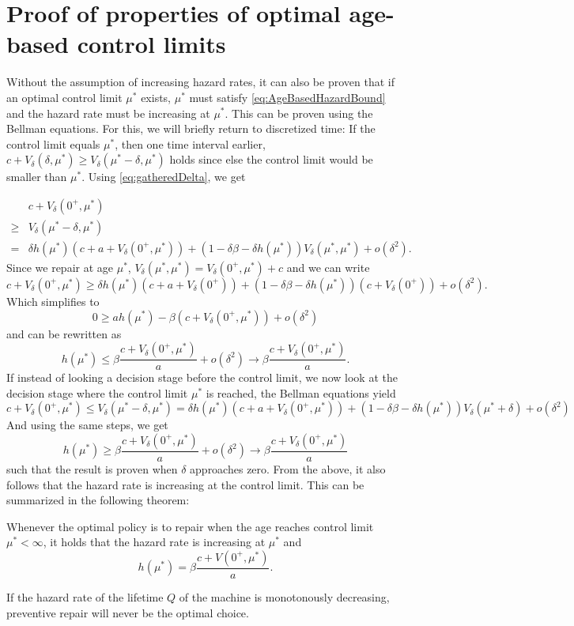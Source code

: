 \chapter{Proof of properties of optimal age-based control limits}\label{AppendixAgeBasedControlLimit}
Without the assumption of increasing hazard rates, it can also be proven that if an optimal control limit $\mu^*$ exists, $\mu^*$ must satisfy \eqref{eq:AgeBasedHazardBound} and the hazard rate must be increasing at $\mu^*$.
This can be proven using the Bellman equations.
For this, we will briefly return to discretized time:
If the control limit equals $\mu^*$, then one time interval earlier, $c+V_\delta(\delta,\mu^*)\geq V_\delta(\mu^*-\delta,\mu^*)$ holds since else the control limit would be smaller than $\mu^*$.
Using \eqref{eq:gatheredDelta}, we get

\[\begin{split}
&c+V_\delta(0^+,\mu^*)\\
\geq& V_\delta(\mu^*-\delta,\mu^*)\\
=&\delta h(\mu^*)(c+a+ V_\delta(0^+,\mu^*))+(1-\delta\beta-\delta h(\mu^*)) V_\delta(\mu^*,\mu^*)+o(\delta^2).
\end{split}
\]
Since we repair at age $\mu^*$, $V_\delta(\mu^*,\mu^*)=V_\delta(0^+,\mu^*)+c$ and we can write
$$
c+V_\delta(0^+,\mu^*)\geq \delta h(\mu^*)(c+a+ V_\delta(0^+))+(1-\delta\beta-\delta h(\mu^*)) (c+V_\delta(0^+))+o(\delta^2).
$$
Which simplifies to
$$
0\geq ah(\mu^*)-\beta (c+V_\delta(0^+,\mu^*))+o(\delta^2)
$$
and can be rewritten as
$$
h(\mu^*)\leq \beta\frac{c+V_\delta(0^+,\mu^*)}{a} +o(\delta^2)\rightarrow\beta\frac{c+V_\delta(0^+,\mu^*)}{a}.
$$
If instead of looking a decision stage before the control limit, we now look at the decision stage where the control limit $\mu^*$ is reached, the Bellman equations yield
$$
c+V_\delta(0^+,\mu^*)\leq V_\delta(\mu^*-\delta,\mu^*)=\delta h(\mu^*)(c+a+ V_\delta(0^+,\mu^*))+(1-\delta\beta-\delta h(\mu^*)) V_\delta(\mu^*+\delta)+o(\delta^2)
$$
And using the same steps, we get
$$
h(\mu^*)\geq \beta\frac{c+V_\delta(0^+,\mu^*)}{a} +o(\delta^2)\rightarrow\beta\frac{c+V_\delta(0^+,\mu^*)}{a}
$$
such that the result is proven when $\delta$ approaches zero.
From the above, it also follows that the hazard rate is increasing at the control limit.
This can be summarized in the following theorem:

\begin{theorem}
	Whenever the optimal policy is to repair when the age reaches control limit $\mu^*<\infty$, it holds that the hazard rate is increasing at $\mu^*$ and
	\[h(\mu^*)=\beta\frac{c+V(0^+,\mu^*)}{a}.\]
\end{theorem}

\begin{corollary}
	If the hazard rate of the lifetime $Q$ of the machine is monotonously decreasing, preventive repair will never be the optimal choice.
\end{corollary}